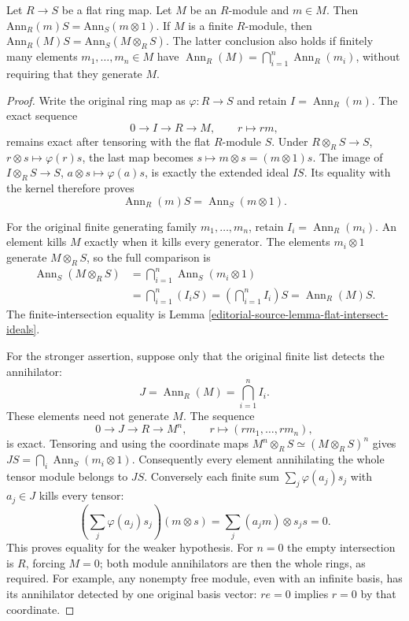 \begin{lemma}
\label{editorial-source-lemma-annihilator-flat-base-change}
Let $R \to S$ be a flat ring map. Let $M$ be an $R$-module and
$m \in M$. Then $\text{Ann}_R(m) S = \text{Ann}_S(m \otimes 1)$.
If $M$ is a finite $R$-module, then
$\text{Ann}_R(M)S=\text{Ann}_S(M\otimes_R S)$.
The latter conclusion also holds if finitely many elements
$m_1,\ldots,m_n\in M$ have
$\operatorname{Ann}_R(M)=\bigcap_{i=1}^n\operatorname{Ann}_R(m_i)$,
without requiring that they generate $M$.
\end{lemma}

\begin{proof}
Write the original ring map as $\varphi:R\to S$ and retain
$I=\operatorname{Ann}_R(m)$. The exact sequence
$$
0\longrightarrow I\longrightarrow R\longrightarrow M,
\qquad r\longmapsto rm,
$$
remains exact after tensoring with the flat $R$-module $S$.
Under $R\otimes_RS\to S$, $r\otimes s\mapsto\varphi(r)s$,
the last map becomes $s\mapsto m\otimes s=(m\otimes1)s$.
The image of $I\otimes_RS\to S$, $a\otimes s\mapsto\varphi(a)s$,
is exactly the extended ideal $IS$. Its equality with the
kernel therefore proves
$$
\operatorname{Ann}_R(m)S=\operatorname{Ann}_S(m\otimes1).
$$

For the original finite generating family $m_1,\ldots,m_n$,
retain $I_i=\operatorname{Ann}_R(m_i)$. An element kills $M$
exactly when it kills every generator. The elements
$m_i\otimes1$ generate $M\otimes_RS$, so the full comparison is
\[

\begin{split}
\operatorname{Ann}_S(M\otimes_RS)
&=\bigcap_{i=1}^n\operatorname{Ann}_S(m_i\otimes1)\\
&=\bigcap_{i=1}^n(I_iS)
=\left(\bigcap_{i=1}^n I_i\right)S
=\operatorname{Ann}_R(M)S.
\end{split}

\]
The finite-intersection equality is
Lemma \ref{editorial-source-lemma-flat-intersect-ideals}.

For the stronger assertion, suppose only that the original
finite list detects the annihilator:
$$
J=\operatorname{Ann}_R(M)=\bigcap_{i=1}^n I_i.
$$
These elements need not generate $M$. The sequence
$$
0\longrightarrow J\longrightarrow R\longrightarrow M^n,
\qquad r\longmapsto(rm_1,\ldots,rm_n),
$$
is exact. Tensoring and using the coordinate maps
$M^n\otimes_RS\simeq(M\otimes_RS)^n$ gives
$JS=\bigcap_i\operatorname{Ann}_S(m_i\otimes1)$.
Consequently every element annihilating the whole tensor
module belongs to $JS$. Conversely each finite sum
$\sum_j\varphi(a_j)s_j$ with $a_j\in J$ kills every tensor:
$$
\left(\sum_j\varphi(a_j)s_j\right)(m\otimes s)
=\sum_j(a_jm)\otimes s_js=0.
$$
This proves equality for the weaker hypothesis. For $n=0$
the empty intersection is $R$, forcing $M=0$; both module
annihilators are then the whole rings, as required.
For example, any nonempty free module, even with an infinite
basis, has its annihilator detected by one original basis
vector: $re=0$ implies $r=0$ by that coordinate.


\end{proof}
